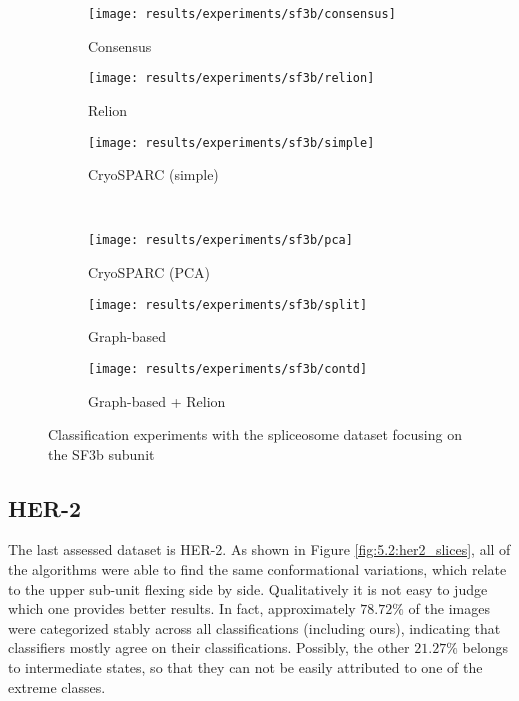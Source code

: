 \documentclass[../main.tex]{subfiles}
\begin{document}
\begin{figure}[hbp]
    \centering
    \begin{subfigure}[b]{0.3\textwidth}
         \centering
         \texttt{[image: results/experiments/sf3b/consensus]}
         \caption{Consensus}
    \end{subfigure}
    \begin{subfigure}[b]{0.3\textwidth}
         \centering
         \texttt{[image: results/experiments/sf3b/relion]}
         \caption{Relion}
    \end{subfigure}
    \begin{subfigure}[b]{0.3\textwidth}
         \centering
         \texttt{[image: results/experiments/sf3b/simple]}
         \caption{CryoSPARC (simple)}
    \end{subfigure}\\
    \vspace{1em}
    \begin{subfigure}[b]{0.3\textwidth}
         \centering
         \texttt{[image: results/experiments/sf3b/pca]}
         \caption{CryoSPARC (PCA)}
    \end{subfigure}
    \begin{subfigure}[b]{0.3\textwidth}
         \centering
         \texttt{[image: results/experiments/sf3b/split]}
         \caption{Graph-based}
    \end{subfigure}
    \begin{subfigure}[b]{0.3\textwidth}
         \centering
         \texttt{[image: results/experiments/sf3b/contd]}
         \caption{Graph-based + Relion}
    \end{subfigure}
    \caption{Classification experiments with the spliceosome dataset focusing on the SF3b subunit}
    \label{fig:5.2:sf3b_slices}
\end{figure}


\subsection{HER-2}
The last assessed dataset is HER-2. As shown in Figure \ref{fig:5.2:her2_slices}, all of the algorithms were able to find the same conformational variations, which relate to the upper sub-unit flexing side by side. Qualitatively it is not easy to judge which one provides better results. In fact, approximately $78.72 \si{\percent}$ of the images were categorized stably across all classifications (including ours), indicating that classifiers mostly agree on their classifications. Possibly, the other $21.27 \si{\percent}$ belongs to intermediate states, so that they can not be easily attributed to one of the extreme classes.
\end{document}
